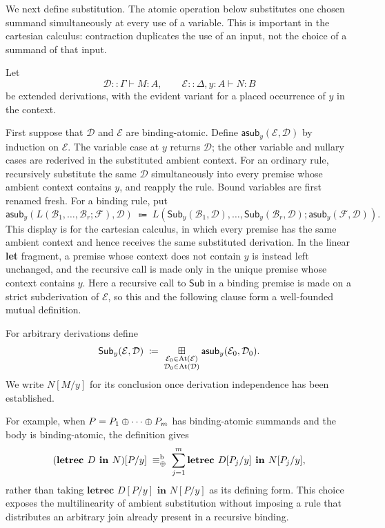 We next define substitution.  The atomic operation below substitutes one
chosen summand simultaneously at every use of a variable.  This is important
in the cartesian calculus: contraction duplicates the use of an input, not
the choice of a summand of that input.

\begin{definition}
\label{def:letrec_substitution}
Let
\[
\mathcal D::\Gamma\vdash M:A,
\qquad
\mathcal E::\Delta,y:A\vdash N:B
\]
be extended derivations, with the evident variant for a placed occurrence of
$y$ in the context.

First suppose that $\mathcal D$ and $\mathcal E$ are binding-atomic.  Define
$\mathsf{asub}_y(\mathcal E,\mathcal D)$ by induction on $\mathcal E$.
The variable case at $y$ returns $\mathcal D$; the other variable and nullary
cases are rederived in the substituted ambient context.  For an ordinary
rule, recursively substitute the same $\mathcal D$ simultaneously into every
premise whose ambient context contains $y$, and reapply the rule.  Bound
variables are first renamed fresh.  For a binding rule, put
\[
\mathsf{asub}_y
  (L(\mathcal B_1,\ldots,\mathcal B_r;\mathcal F),\mathcal D)
\;\Coloneqq\;
L(\mathsf{Sub}_y(\mathcal B_1,\mathcal D),\ldots,
  \mathsf{Sub}_y(\mathcal B_r,\mathcal D);
  \mathsf{asub}_y(\mathcal F,\mathcal D)).
\]
This display is for the cartesian calculus, in which every premise has the
same ambient context and hence receives the same substituted derivation.  In
the linear \textbf{let} fragment, a premise whose context does not contain
$y$ is instead left unchanged, and the recursive call is made only in the
unique premise whose context contains $y$.
Here a recursive call to $\mathsf{Sub}$ in a binding premise is made on a
strict subderivation of $\mathcal E$, so this and the following clause form a
well-founded mutual definition.

For arbitrary derivations define
\[
\mathsf{Sub}_y(\mathcal E,\mathcal D)
\;\mathrel{\vcentcolon\mathrel{\mkern-1.2mu}=}\;
\mathop{\boxplus}\displaylimits_{\substack{
  \mathcal E_0\in\operatorname{At}(\mathcal E)\\
  \mathcal D_0\in\operatorname{At}(\mathcal D)}}
\mathsf{asub}_y(\mathcal E_0,\mathcal D_0).
\]
We write $N[M/y]$ for its conclusion once derivation independence has been
established.
\end{definition}

For example, when $P=P_1\mathbin{\oplus} \cdots\mathbin{\oplus} P_m$ has binding-atomic summands and the body
is binding-atomic, the definition gives
\[
(\textbf{letrec }D\textbf{ in }N)[P/y]
\;\equiv_{\mathbin{\oplus}}^{\mathrm b}\;
\sum_{j=1}^{m}
 \textbf{letrec }D[P_j/y]\textbf{ in }N[P_j/y],
\]
rather than taking
$\textbf{letrec }D[P/y]\textbf{ in }N[P/y]$ as its defining form.  This
choice exposes the multilinearity of ambient substitution without imposing a
rule that distributes an arbitrary join already present in a recursive
binding.

